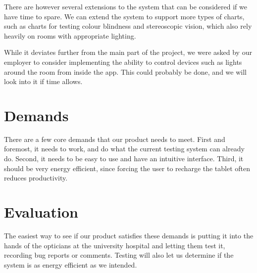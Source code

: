 \documentclass[12pt,a4paper,notitlepage]{report}
\begin{document}
There are however several extensions to the system that can be considered if we have time to spare. We can extend the system to support more types of charts, such as charts for testing colour blindness and stereoscopic vision, which also rely heavily on rooms with appropriate lighting.

While it deviates further from the main part of the project, we were asked by our employer to consider implementing the ability to control devices such as lights around the room from inside the app. This could probably be done, and we will look into it if time allows.

\section{Demands} %
There are a few core demands that our product needs to meet. First and foremost, it needs to work, and do what the current testing system can already do. Second, it needs to be easy to use and have an intuitive interface. Third, it should be very energy efficient, since forcing the user to recharge the tablet often reduces productivity. 

\section{Evaluation} %
The easiest way to see if our product satisfies these demands is putting it into the hands of the opticians at the university hospital and letting them test it, recording bug reports or comments. Testing will also let us determine if the system is as energy efficient as we intended.



\end{document}
